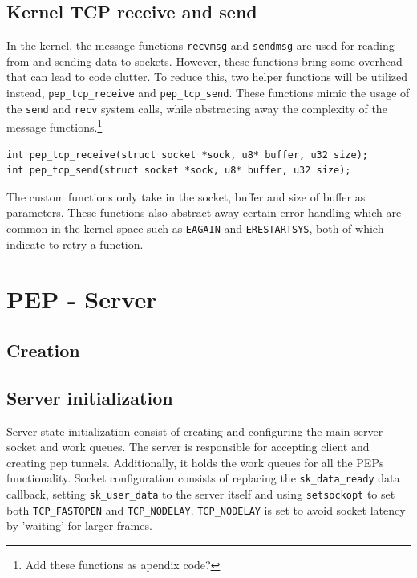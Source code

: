 \documentclass[a4paper,english, 11pt]{report}
\begin{document}
\subsection{Kernel TCP receive and send}
In the kernel, the message functions \verb|recvmsg| and \verb|sendmsg| are used for reading from and sending data to sockets. However, these functions bring some overhead that can lead to code clutter. To reduce this, two helper functions will be utilized instead, \verb|pep_tcp_receive| and \verb|pep_tcp_send|. These functions mimic the usage of the \verb|send| and \verb|recv| system calls, while abstracting away the complexity of the message functions.\footnote{Add these functions as apendix code?}

\begin{verbatim}
int pep_tcp_receive(struct socket *sock, u8* buffer, u32 size);
int pep_tcp_send(struct socket *sock, u8* buffer, u32 size);
\end{verbatim}

The custom functions only take in the socket, buffer and size of buffer as parameters. These functions also abstract away certain error handling which are common in the kernel space such as \verb|EAGAIN| and \verb|ERESTARTSYS|, both of which indicate to retry a function.

\section{PEP - Server}

\subsection{Creation}

\subsection{Server initialization}
Server state initialization consist of creating and configuring the main server socket and work queues. The server is responsible for accepting client and creating pep tunnels. Additionally, it holds the work queues for all the PEPs functionality. Socket configuration consists of replacing the \verb|sk_data_ready| data callback, setting \verb|sk_user_data| to the server itself and using \verb|setsockopt| to set both \verb|TCP_FASTOPEN| and \verb|TCP_NODELAY|. \verb|TCP_NODELAY| is set to avoid socket latency by 'waiting' for larger frames.
\end{document}
